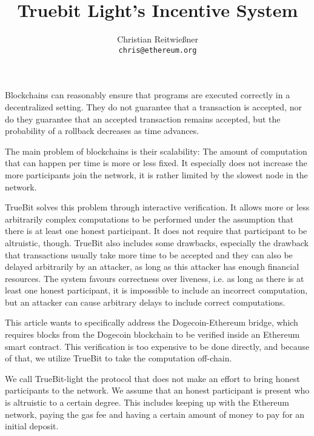 \documentclass[11pt,letterpaper]{article}
\date{}
\begin{document}


\title{Truebit Light's Incentive System}

\author{Christian Reitwießner \\ 
{\tt chris@ethereum.org}}


\maketitle



Blockchains can reasonably ensure that programs are executed correctly in a decentralized setting.
They do not guarantee that a transaction is accepted, nor do they guarantee that an accepted transaction remains
accepted, but the probability of a rollback decreases as time advances.

The main problem of blockchains is their scalability: The amount of computation that can happen per time is more or less fixed.
It especially does not increase the more participants join the network, it is rather limited by the slowest node in the
network.

TrueBit solves this problem through interactive verification. It allows more or less arbitrarily complex computations to
be performed under the assumption that there is at least one honest participant. It does not require that participant
to be altruistic, though. TrueBit also includes some drawbacks, especially the drawback that transactions usually take
more time to be accepted and they can also be delayed arbitrarily by an attacker, as long as this attacker has enough
financial resources. The system favours correctness over liveness, i.e. as long as there is at least one honest
participant, it is impossible to include an incorrect computation, but an attacker can cause arbitrary delays to include
correct computations.

This article wants to specifically address the Dogecoin-Ethereum bridge, which requires blocks from the Dogecoin
blockchain to be verified inside an Ethereum smart contract. This verification is too expensive to be done directly,
and because of that, we utilize TrueBit to take the computation off-chain.

We call TrueBit-light the protocol that does not make an effort to bring honest participants to the network.
We assume that an honest participant is present who is altruistic to a certain degree. This includes keeping up
with the Ethereum network, paying the gas fee and having a certain amount of money to pay for an initial deposit.
\end{document}
